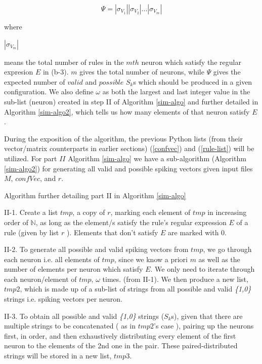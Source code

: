 \documentclass{svmultm}
\begin{document}
{
\begin{equation}\label{psi}
\Psi = |{\sigma_{V_1}}| |{\sigma_{V_2}}| ...|{\sigma_{V_m}}|
\end{equation}
}

where

$|{\sigma_{V_m}}|$

means the total number of rules in the $mth$ neuron which satisfy the regular expresion $E$ in (b-3). $m$ gives the total number of neurons, while $\Psi$ gives the expected number of $valid$ and $possible$ $S_k$s which should be produced in a given configuration.
We also define $\omega$ as both the largest and last integer value in the sub-list (neuron) created in step II of Algorithm \ref{sim-algo} and further detailed in Algorithm \ref{sim-algo2}, which tells us how many elements of that neuron satisfy $E$.

During the exposition of the algorithm, the previous Python
lists (from their vector/matrix counterparts in earlier
sections) (\ref{confvec}) and (\ref{rule-list}) will be utilized. For part $II$ Algorithm \ref{sim-algo} we have a sub-algorithm (Algorithm \ref{sim-algo2}) for generating all valid
and possible spiking vectors given input files $M$, $confVec$, and $r$.


\begin{algorithm}
\caption{Algorithm further detailing part II in Algorithm \ref{sim-algo}}
\label{sim-algo2}
\begin{algorithmic}
\item [II-1.] Create a list $tmp$, a copy of $r$, marking
each element of $tmp$ in increasing order of $\mathbb N$,
as long as the element/s satisfy the rule's 
regular expression $E$ of a rule (given by list
$r$ ). Elements that don't satisfy $E$ are marked with 0.\\
 
\item [II-2.] To generate all possible and valid spiking vectors from
$tmp$, we go through each neuron i.e. all elements of $tmp$,
since we know a priori $m$ as well as the number of
elements per neuron which satisfy $E$. We only need to iterate
through each neuron/element of $tmp$, $\omega$ times. 
(from II-1). We then produce a new list, $tmp2$, which is
made up of a sub-list of strings from all possible and valid
\textit{\{1,0\}} strings i.e. spiking vectors per neuron.\\

\item  [II-3.] To obtain all possible and valid \textit{\{1,0\}}
strings ($S_k$s), given that there are multiple strings
to be concatenated ( as in $tmp2$'s case ), pairing up the
neurons first, in order, and then exhaustively distributing
every element of the first neuron to the elements of the 2nd
one in the pair. These paired-distributed strings will be stored in a new list, $tmp3$.

\end{algorithmic}
\end{algorithm}
\end{document}
